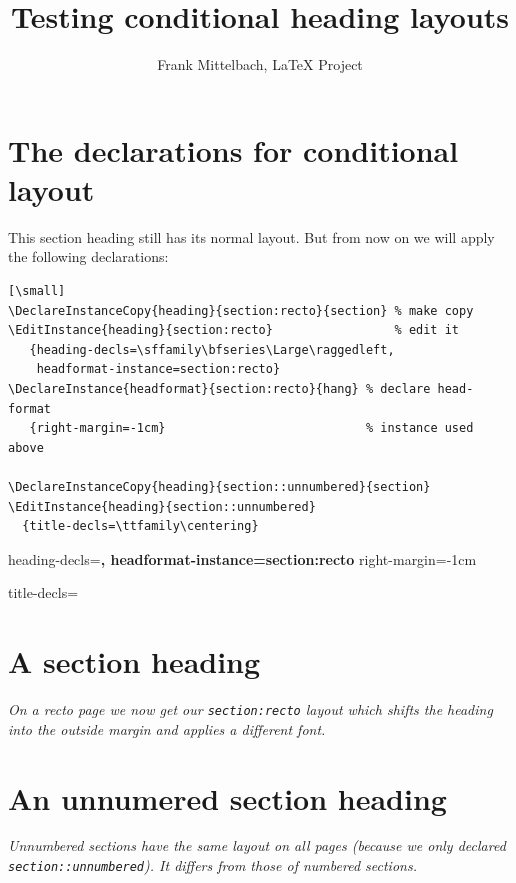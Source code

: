 \documentclass[a4paper,twoside]{article}
\begin{document}
\title{Testing conditional heading layouts}
\author{Frank Mittelbach, \LaTeX{} Project}
\maketitle

\section{The declarations for conditional layout}

This section heading still has its normal layout.
But from now on we will apply the following declarations:
\begin{verbatim}[\small]
\DeclareInstanceCopy{heading}{section:recto}{section} % make copy
\EditInstance{heading}{section:recto}                 % edit it
   {heading-decls=\sffamily\bfseries\Large\raggedleft,
    headformat-instance=section:recto}
\DeclareInstance{headformat}{section:recto}{hang} % declare head-format
   {right-margin=-1cm}                            % instance used above

\DeclareInstanceCopy{heading}{section::unnumbered}{section}
\EditInstance{heading}{section::unnumbered}
  {title-decls=\ttfamily\centering}
\end{verbatim}

   {heading-decls=\sffamily\bfseries\Large\raggedleft,
    headformat-instance=section:recto}
   {right-margin=-1cm}

  {title-decls=\ttfamily\centering}


\section{A section heading}

\emph{On a recto page we now get our \texttt{section:recto} layout which
shifts the heading into the outside margin and applies a different
font.}

\kant[1][1-2]

\section*{An unnumered section heading}

\emph{Unnumbered sections have the same layout on all pages (because we
only declared \texttt{section::unnumbered}). It differs from those
of numbered sections.}
\end{document}
